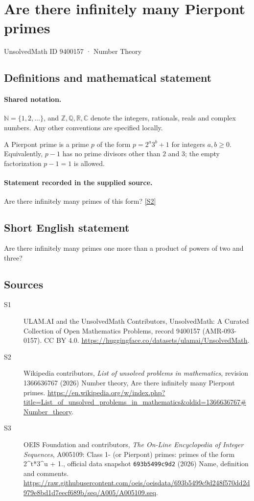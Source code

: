 \documentclass[11pt]{article}
\newcommand{\sref}[2]{\hyperlink{source:#1:#2}{[S#2]}}
\begin{document}
\setcounter{section}{9400156}
\section{Are there infinitely many Pierpont primes}\label{9400157}
{\small\sffamily UnsolvedMath ID 9400157 · Number Theory}
\subsection{Definitions and mathematical statement}

\paragraph{Shared notation.}$\mathbb N=\{1,2,\ldots\}$, and $\mathbb Z,\mathbb Q,\mathbb R,\mathbb C$ denote the integers, rationals, reals and complex numbers. Any other conventions are specified locally.


A Pierpont prime is a prime $p$ of the form $p=2^a3^b+1$ for integers $a,b\ge0$. Equivalently, $p-1$ has no prime divisors other than $2$ and $3$; the empty factorization $p-1=1$ is allowed.
\paragraph{Statement recorded in the supplied source.}
Are there infinitely many primes of this form? \sref{9400157}{2}
\subsection{Short English statement}
Are there infinitely many primes one more than a product of powers of two and three?
\subsection{Sources}
\begin{description}
\item[\hypertarget{source:9400157:1}{S1}] ULAM.AI and the UnsolvedMath Contributors, UnsolvedMath: A Curated Collection of Open Mathematics Problems, record 9400157 (AMR-093-0157). CC BY 4.0. \url{https://huggingface.co/datasets/ulamai/UnsolvedMath}.
\item[\hypertarget{source:9400157:2}{S2}] Wikipedia contributors, \emph{List of unsolved problems in mathematics}, revision 1366636767 (2026) Number theory, Are there infinitely many Pierpont primes. \url{https://en.wikipedia.org/w/index.php?title=List_of_unsolved_problems_in_mathematics&oldid=1366636767#Number_theory}.
\item[\hypertarget{source:9400157:3}{S3}] OEIS Foundation and contributors, \emph{The On-Line Encyclopedia of Integer Sequences}, A005109: Class 1- (or Pierpont) primes: primes of the form 2\textasciicircum{}t*3\textasciicircum{}u + 1., official data snapshot \texttt{693b5499c9d2} (2026) Name, definition and comments. \url{https://raw.githubusercontent.com/oeis/oeisdata/693b5499c9d248f570dd2d979e8bd1d7eecf689b/seq/A005/A005109.seq}.
\end{description}
\label{end:9400157}
\end{document}
